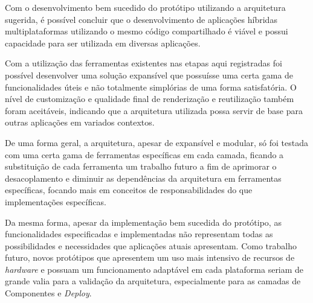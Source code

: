 Com o desenvolvimento bem sucedido do protótipo utilizando a arquitetura sugerida, é possível concluir que o desenvolvimento de aplicações híbridas multiplataformas utilizando o mesmo código compartilhado é viável e possui capacidade para ser utilizada em diversas aplicações.

Com a utilização das ferramentas existentes nas etapas aqui registradas foi possível desenvolver uma solução expansível que possuísse uma certa gama de funcionalidades úteis e não totalmente simplórias de uma forma satisfatória. O nível de customização e qualidade final de renderização e reutilização também foram aceitáveis, indicando que a arquitetura utilizada possa servir de base para outras aplicações em variados contextos.

De uma forma geral, a arquitetura, apesar de expansível e modular, só foi testada com uma certa gama de ferramentas específicas em cada camada, ficando a substituição de cada ferramenta um trabalho futuro a fim de aprimorar o desacoplamento e diminuir as dependências da arquitetura em ferramentas específicas, focando mais em conceitos de responsabilidades do que implementações específicas.

Da mesma forma, apesar da implementação bem sucedida do protótipo, as funcionalidades especificadas e implementadas não representam todas as possibilidades e necessidades que aplicações atuais apresentam. Como trabalho futuro, novos protótipos que apresentem um uso mais intensivo de recursos de \textit{hardware} e possuam um funcionamento adaptável em cada plataforma seriam de grande valia para a validação da arquitetura, especialmente para as camadas de Componentes e \textit{Deploy}.
